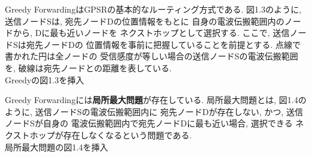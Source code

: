 Greedy ForwardingはGPSRの基本的なルーティング方式である.
図1.3のように, 送信ノードSは, 宛先ノードDの位置情報をもとに
自身の電波伝搬範囲内のノードから, Dに最も近いノードを
ネクストホップとして選択する. ここで, 送信ノードSは宛先ノードDの
位置情報を事前に把握していることを前提とする. 点線で書かれた円は全ノードの
受信感度が等しい場合の送信ノードSの電波伝搬範囲を, 
破線は宛先ノードとの距離を表している.\\

{\LARGE Greedyの図1.3を挿入}

Greedy Forwardingには\textbf{局所最大問題}が存在している. 
局所最大問題とは, 図1.4のように, 送信ノードSの電波伝搬範囲内に
宛先ノードDが存在しない, かつ, 送信ノードSが自身の
電波伝搬範囲内で宛先ノードDに最も近い場合, 選択できる
ネクストホップが存在しなくなるという問題である.\\

{\LARGE 局所最大問題の図1.4を挿入}
